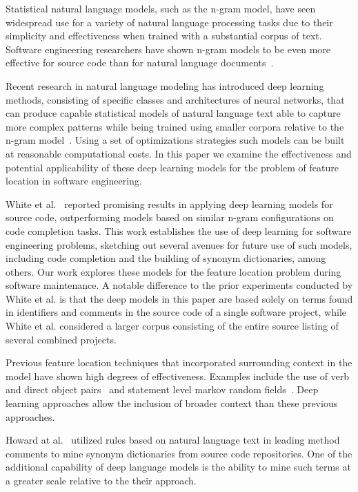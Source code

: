 


%
%
Statistical natural language models, such as the n-gram model, have seen
widespread use for a variety of natural language processing tasks due to their
simplicity and effectiveness when trained with a substantial corpus of text.
Software engineering researchers have shown n-gram models to be even more
effective for source code than for natural language
documents~\cite{hindle_naturalness_2012}.


Recent research in natural language modeling has introduced deep learning
methods, consisting of specific classes and architectures of neural networks,
that can produce capable statistical models of natural language text able to
capture more complex patterns while being trained using smaller corpora relative
to the n-gram model~\cite{mikolov_distributed_2013,le_distributed_2014}. Using
a set of optimizations strategies such models can be built at reasonable
computational costs.  In this paper we examine the effectiveness and potential
applicability of these deep learning models for the problem of feature location
in software engineering.



White et al.~\cite{white_toward_2015} reported promising results in applying
deep learning models for source code, outperforming models based on similar
n-gram configurations on code completion tasks. This work establishes the use of
deep learning for software engineering problems, sketching out several avenues
for future use of such models, including code completion and the building of
synonym dictionaries, among others. Our work explores these models for the
feature location problem during software maintenance. A notable difference to
the prior experiments conducted by White et al. is that the deep models in this
paper are based solely on terms found in identifiers and comments in the source
code of a single software project, while White et al. considered a larger corpus
consisting of the entire source listing of several combined projects.



Previous feature location techniques that incorporated surrounding context in
the model have shown high degrees of effectiveness. Examples include the use of
verb and direct object pairs~\cite{shepherd_using_2007} and statement level
markov random fields~\cite{hill_use_2014}. Deep learning approaches allow the
inclusion of broader context than these previous approaches.

Howard at al.~\cite{howard_automatically_2013} utilized rules based on natural
language text in leading method comments to mine synonym dictionaries from
source code repositories. One of the additional capability of deep language
models is the ability to mine such terms at a greater scale relative to the
their approach.
